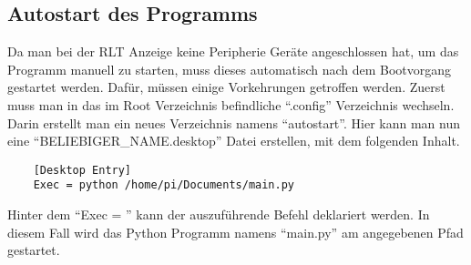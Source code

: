 \subsection{Autostart des Programms} \label{autostart}
Da man bei der RLT Anzeige keine Peripherie Geräte angeschlossen hat, um das Programm manuell zu starten, muss dieses automatisch nach dem Bootvorgang gestartet werden. Dafür, müssen einige Vorkehrungen getroffen werden. \newline Zuerst muss man in das im Root Verzeichnis befindliche \enquote{.config} Verzeichnis wechseln. Darin erstellt man ein neues Verzeichnis namens \enquote{autostart}. Hier kann man nun eine \enquote{BELIEBIGER\_NAME.desktop} Datei erstellen, mit dem folgenden Inhalt.
\begin{lstlisting}
	[Desktop Entry]
	Exec = python /home/pi/Documents/main.py
\end{lstlisting}
Hinter dem \enquote{Exec = } kann der auszuführende Befehl deklariert werden. In diesem Fall wird das Python Programm namens \enquote{main.py} am angegebenen Pfad gestartet. \cite{Grace_Xing:2021}